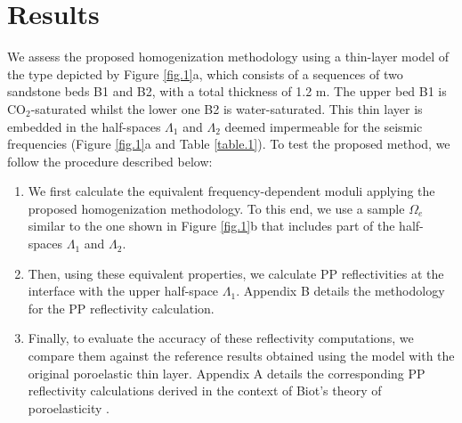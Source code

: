 \documentclass[draft]{agujournal2019}
\begin{document}

\section{Results}
We assess the proposed homogenization methodology using a thin-layer model of the type depicted by Figure \ref{fig.1}a,  which consists of a sequences of two sandstone beds B1 and B2, with a total thickness of 1.2 m.  The upper bed B1 is CO$_2$-saturated whilst the lower one B2 is water-saturated. This thin layer is embedded 
in the half-spaces $\Lambda_1$ and $\Lambda_2$ deemed impermeable for the seismic frequencies (Figure \ref{fig.1}a and Table \ref{table.1}). To test the proposed method, we follow the procedure described below: 
\begin{enumerate}
    \item We first calculate the equivalent frequency-dependent moduli applying the proposed homogenization methodology. To this end, we use a sample $\Omega_e$ similar to the one shown in Figure \ref{fig.1}b that includes part of the half-spaces $\Lambda_1$ and $\Lambda_2$. 
   
    \item Then, using these equivalent properties, we calculate PP reflectivities  at the interface with the upper half-space $\Lambda_1$. Appendix B details the methodology for the PP reflectivity calculation.
    
    \item  Finally, to evaluate the accuracy of these reflectivity computations, we compare them against the reference results obtained using the model with the original poroelastic thin layer. Appendix A details the corresponding  PP reflectivity calculations derived in the context of Biot's theory of poroelasticity \cite{Biot1962}.
\end{enumerate}
\end{document}
